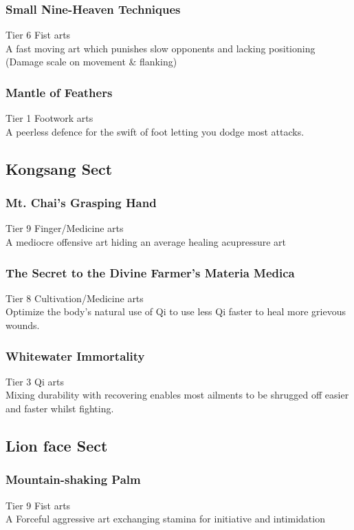 \subsubsection{Small Nine-Heaven Techniques}
Tier 6 Fist arts\\
A fast moving art which punishes slow opponents and lacking positioning (Damage scale on movement \& flanking)

\subsubsection{Mantle of Feathers}
Tier 1 Footwork arts\\
A peerless defence for the swift of foot letting you dodge most attacks.

\subsection{Kongsang Sect}
\subsubsection{Mt. Chai's Grasping Hand}
Tier 9 Finger/Medicine arts\\
A mediocre offensive art hiding an average healing acupressure art

\subsubsection{The Secret to the Divine Farmer's Materia Medica}
Tier 8 Cultivation/Medicine arts\\
Optimize the body's natural use of Qi to use less Qi faster to heal more grievous wounds.

\subsubsection{Whitewater Immortality}
Tier 3 Qi arts\\
Mixing durability with recovering enables most ailments to be shrugged off easier and faster whilst fighting.

\subsection{Lion face Sect}
\subsubsection{Mountain-shaking Palm}
Tier 9 Fist arts\\
A Forceful aggressive art exchanging stamina for initiative and intimidation

